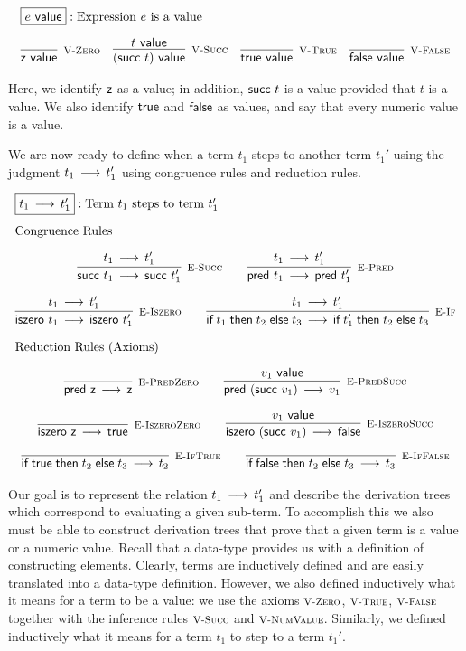 \[
\begin{array}{c}
\multicolumn{1}{l}{\fbox{$e \Value$}: \mbox{Expression $e$ is a value}}\\[1em]
\infer[\VZero]{\tmzero \Value}{} \quad
\infer[\VSucc]{(\tmsucc t) \Value}{t \Value} \quad
\infer[\VTrue]{\tmtrue \Value}{} \quad
\infer[\VFalse]{\tmfalse \Value}{} 
\end{array}
\]

Here, we identify $\textsf{z}$ as a value; in addition, $\textsf{succ}~t$ is a
value provided that $t$ is a value. We also identify $\textsf{true}$
and $\textsf{false}$ as values, and say that every numeric value is a value.

We are now ready to define when a term $t_1$ steps to another term $t_1'$ using
the judgment $t_1 \mathrel{\,\longrightarrow\,} t_1'$ using congruence rules and reduction rules.

\[
\begin{array}{c}
\multicolumn{1}{l}{\fbox{$t_1 \Steps t_1'$}: \mbox{Term $t_1$ steps to term $t_1'$}}
\\[1em]
\multicolumn{1}{l}{\mbox{\text{Congruence Rules}}}
\\[1em]
\infer[\ESucc]{\tmsucc t_1 \Steps \tmsucc t_1'}{t_1 \Steps t_1'}\qquad
\infer[\EPred]{\tmpred t_1 \Steps \tmpred t_1'}{t_1 \Steps t_1'}
\\[1em]
\infer[\EIsZero]{\tmiszero t_1 \Steps \tmiszero t_1'}{t_1 \Steps t_1'}\qquad
\infer[\EIf]{\tmif{t_1}{t_2}{t_3} \Steps \tmif{t_1'}{t_2}{t_3}}{t_1 \Steps t_1'}
\\[1em]
\multicolumn{1}{l}{\mbox{\text{Reduction Rules (Axioms)}}}
\\[1em]
\infer[\EPredZ]{\tmpred \tmzero \Steps \tmzero}{}\qquad
\infer[\EPredSucc]{\tmpred (\tmsucc v_1) \Steps v_1}{v_1 \Value}
\\[1em]
\infer[\EIsZeroZ]{\tmiszero \tmzero \Steps \tmtrue}{} \qquad
\infer[\EIsZeroSucc]{\tmiszero (\tmsucc v_1) \Steps \tmfalse}{v_1 \Value}
\\[1em]
\infer[\EIfT]{\tmif \tmtrue {t_2}{t_3} \Steps t_2}{}\qquad
\infer[\EIfF]{\tmif \tmfalse {t_2}{t_3} \Steps t_3}{}
\end{array}
\]

Our  goal  is  to  represent  the  relation  $t_1 \mathrel{\,\longrightarrow\,} t_1'$ and  describe the
derivation trees which correspond to evaluating a given sub-term.
To accomplish this we also must be able to construct derivation trees that prove
that  a given  term is  a value  or a  numeric  value. Recall  that a  data-type
provides us with a definition of constructing elements.
Clearly,  terms  are  inductively  defined  and  are  easily  translated  into a
data-type definition. However,  we also defined inductively  what it means for a
term  to be a value:  we use the  axioms $\textsc{\footnotesize V-Zero}$, $\textsc{\footnotesize V-True}$,
$\textsc{\footnotesize V-False}$  together  with  the   inference  rules  $\textsc{\footnotesize V-Succ}$  and  $\textsc{\footnotesize V-NumValue}$.
Similarly,  we defined inductively  what it means for a term $t_1$  to step to a
term $t_1'$.

